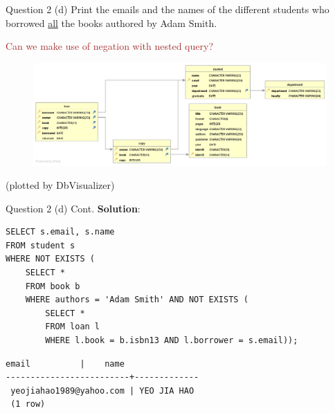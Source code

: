 \begin{frame}[fragile]{Question 2 (d)}
Print the emails and the names of the different students who borrowed \underline{all} the books authored by Adam Smith.

\textcolor{brown}{Can we make use of negation with nested query?}

\begin{figure}
	\includegraphics[width=1\textwidth]{t1/images/t1-end.png}
\end{figure}\vspace{-10pt}
{\tiny(plotted by DbVisualizer)}
\end{frame}

\begin{frame}[fragile]{Question 2 (d) Cont.}
\textbf{Solution}:
\begin{lstlisting}
SELECT s.email, s.name
FROM student s
WHERE NOT EXISTS (
	SELECT * 
	FROM book b
	WHERE authors = 'Adam Smith' AND NOT EXISTS (
		SELECT * 
		FROM loan l
		WHERE l.book = b.isbn13 AND l.borrower = s.email));
\end{lstlisting}\vspace{5pt}
\begin{lstlisting}[style=terminal]	
          email          |    name
-------------------------+-------------
 yeojiahao1989@yahoo.com | YEO JIA HAO
 (1 row)	
\end{lstlisting}
\end{frame}

